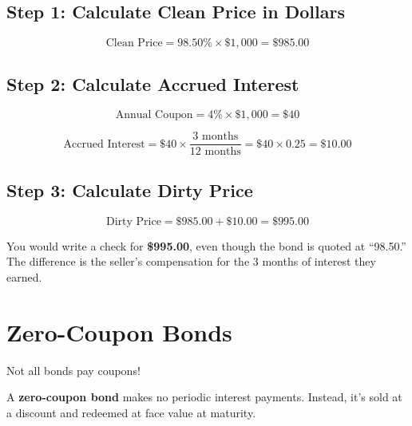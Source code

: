 \documentclass[
  letterpaper,
]{scrbook}
\begin{document}
\subsection{Step 1: Calculate Clean Price in
Dollars}\label{step-1-calculate-clean-price-in-dollars}

\[
\text{Clean Price} = 98.50\% \times \$1,000 = \$985.00
\]

\subsection{Step 2: Calculate Accrued
Interest}\label{step-2-calculate-accrued-interest}

\[
\text{Annual Coupon} = 4\% \times \$1,000 = \$40
\]

\[
\text{Accrued Interest} = \$40 \times \frac{3\text{ months}}{12\text{ months}} = \$40 \times 0.25 = \$10.00
\]

\subsection{Step 3: Calculate Dirty
Price}\label{step-3-calculate-dirty-price}

\[
\text{Dirty Price} = \$985.00 + \$10.00 = \$995.00
\]

\begin{tcolorbox}[enhanced jigsaw, toptitle=1mm, colbacktitle=quarto-callout-tip-color!10!white, opacityback=0, leftrule=.75mm, breakable, colframe=quarto-callout-tip-color-frame, toprule=.15mm, opacitybacktitle=0.6, coltitle=black, bottomrule=.15mm, colback=white, arc=.35mm, titlerule=0mm, rightrule=.15mm, left=2mm, title=\textcolor{quarto-callout-tip-color}{\faLightbulb}\hspace{0.5em}{What You Actually Pay}, bottomtitle=1mm]

You would write a check for \textbf{\$995.00}, even though the bond is
quoted at ``98.50.'' The difference is the seller's compensation for the
3 months of interest they earned.

\end{tcolorbox}

\section{Zero-Coupon Bonds}\label{zero-coupon-bonds}

Not all bonds pay coupons!

\begin{tcolorbox}[enhanced jigsaw, toptitle=1mm, colbacktitle=quarto-callout-note-color!10!white, opacityback=0, leftrule=.75mm, breakable, colframe=quarto-callout-note-color-frame, toprule=.15mm, opacitybacktitle=0.6, coltitle=black, bottomrule=.15mm, colback=white, arc=.35mm, titlerule=0mm, rightrule=.15mm, left=2mm, title=\textcolor{quarto-callout-note-color}{\faInfo}\hspace{0.5em}{Definition: Zero-Coupon Bond}, bottomtitle=1mm]

A \textbf{zero-coupon bond} makes no periodic interest payments.
Instead, it's sold at a discount and redeemed at face value at maturity.

\end{tcolorbox}
\end{document}
